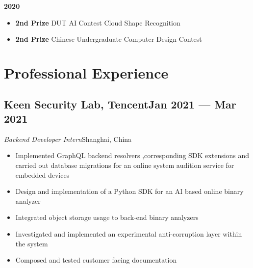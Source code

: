 \documentclass[a4,12pt]{article}
\newcommand{\subtext}[1]{
#1\par\vspace{-0.3cm}}
\newenvironment{zitemize}{
\begin{itemize}\itemsep0pt \parskip0pt \parsep1pt}
{\end{itemize}\vspace{-0.5cm}}
\begin{document}
\vspace{0.3cm}
\subtext{\textbf{2020}}
\begin{zitemize}
    \item \textbf{2nd Prize} DUT AI Contest Cloud Shape Recognition
    \item \textbf{2nd Prize} Chinese Undergraduate Computer Design Contest
\end{zitemize}



\section{\textbf{Professional Experience}}

        

\subsection*{Keen Security Lab, Tencent\hfill Jan 2021 --- Mar 2021} 
\subtext{\textit{Backend Developer Intern}\hfill Shanghai, China} 
    \begin{zitemize}
        \item Implemented GraphQL backend resolvers ,corresponding SDK extensions and carried out database migrations for an online system audition service for embedded devices
        \item Design and implementation of a Python SDK for an AI based online binary analyzer
        \item Integrated object storage usage to back-end binary analyzers
        \item Investigated and implemented an experimental anti-corruption layer within the system
        \item Composed and tested customer facing documentation 
    \end{zitemize}
\end{document}
